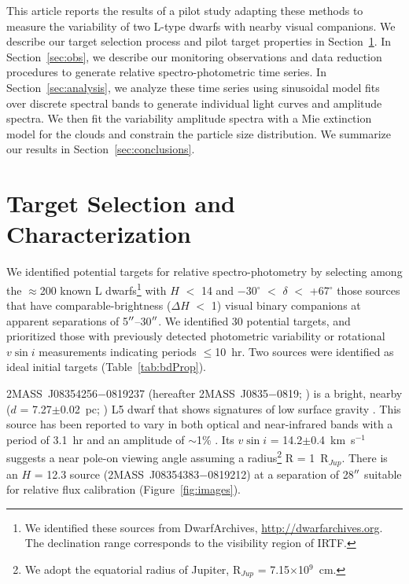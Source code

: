 \documentclass[twocolumn]{aastex6}
\newcommand{\degree}{$^\circ$}
\newcommand{\kms}{km~s$^{-1}$}
\newcommand{\rjup}{R$_{Jup}$}
\newcommand{\sha}{2MASS~J0835$-$0819}
\begin{document}
This article reports the results of a pilot study adapting these methods to measure the variability of two L-type dwarfs with nearby visual companions. We describe our target selection process and pilot target properties in Section~\ref{sec:targets}.
In Section~\ref{sec:obs}, we describe our monitoring observations and data reduction procedures to generate relative spectro-photometric time series.
In Section~\ref{sec:analysis}, we analyze these time series using sinusoidal model fits over discrete spectral bands to generate individual light curves and amplitude spectra.
We then fit the variability amplitude spectra with a Mie extinction model for the clouds and constrain the particle size distribution.
We summarize our results in Section~\ref{sec:conclusions}.

\section{Target Selection and Characterization}\label{sec:targets}

We identified potential targets for relative spectro-photometry by selecting among the $\approx$200 known L dwarfs\footnote{We identified these sources from DwarfArchives,  \url{http://dwarfarchives.org}. The declination range corresponds to the visibility region of IRTF.} with $H$ $<$ 14 and $-$30{\degree}  $<$ $\delta$ $<$ +67{\degree} those sources that have comparable-brightness ($\Delta{H}$ $<$ 1) visual binary companions at apparent separations of 5$\mbox{$^{\prime\prime}$}$--30$\mbox{$^{\prime\prime}$}$. We identified 30 potential targets, and prioritized those with previously detected photometric variability or rotational $v\sin{i}$ measurements indicating periods $\leq$10~hr.  Two sources were identified as ideal initial targets (Table~\ref{tab:bdProp}).

2MASS~J08354256$-$0819237 (hereafter {\sha}; \citealt{2003AJ....126.2421C}) is a bright, nearby ($d$ = 7.27$\pm$0.02~pc; \citealt{2016AJ....152...24W}) L5 dwarf that shows signatures of low surface gravity \citep{2016ApJ...833...96L}. 
This source has been reported to vary in both optical and near-infrared bands with a period of 3.1~hr and an amplitude of $\sim$1\%  \citep{2004MNRAS.354..378K,2014A&A...566A.111W}.
Its $v\sin{i}$ = 14.2$\pm$0.4~{\kms} \citep{2010ApJ...723..684B} suggests a near pole-on viewing angle assuming a radius\footnote{We adopt the equatorial radius of Jupiter, {\rjup} = 7.15$\times$10$^9$~cm.} R = 1~{\rjup}.
There is an $H$ = 12.3 source (2MASS~J08354383$-$0819212) at a separation of 28$\mbox{$^{\prime\prime}$}$ suitable for relative flux calibration (Figure~\ref{fig:images}). 
\end{document}
